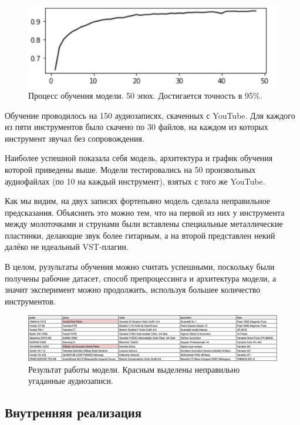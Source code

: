 \documentclass[14pt,a4paper]{article}
\begin{document}
\begin{figure}[H]
\centering
\includegraphics[scale=0.3]{img/training.png}
\caption{Процесс обучения модели. 50 эпох. Достигается точность в 95\%.}
\label{fig:diagram}
\end{figure}

Обучение проводилось на 150 аудиозаписях, скаченных с YouTube. Для каждого из пяти инструментов было скачено по 30 файлов, на каждом из которых инструмент звучал без сопровождения.

Наиболее успешной показала себя модель, архитектура и график обучения которой приведены выше. Модели тестировались на 50 произвольных аудиофайлах (по 10 на каждый инструмент), взятых с того же YouTube.

Как мы видим, на двух записях фортепьяно модель сделала неправильное предсказания. Объяснить это можно тем, что на первой из них у инструмента между молоточками и струнами были вставлены специальные металлические пластинки, делающие звук более гитарным, а на второй представлен некий далёко не идеальный VST-плагин.

В целом, рузультаты обучения можно считать успешными, поскольку были получены рабочие датасет, способ препроцессинга и архитектура модели, а значит эксперимент можно продолжить, используя большее количество инструментов.

\begin{figure}[H]
\centering
\includegraphics[scale=0.37]{img/results.png}
\caption{Результат работы модели. Красным выделены неправильно угаданные аудиозаписи.}
\label{fig:diagram}
\end{figure}

\subsection{Внутренняя реализация}
\end{document}

